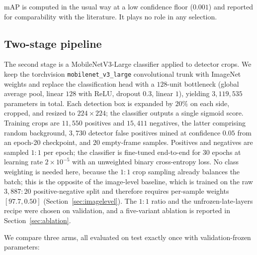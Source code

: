 mAP is computed in the usual way at a low confidence floor ($0.001$) and reported
for comparability with the literature. It plays no role in any selection.

\subsection{Two-stage pipeline}

The second stage is a MobileNetV3-Large classifier \citep{howard2019mobilenetv3}
applied to detector crops. We keep the torchvision
\texttt{mobilenet\_v3\_large} convolutional trunk with ImageNet weights and
replace the classification head with a $128$-unit bottleneck (global average
pool, linear $128$ with ReLU, dropout $0.3$, linear $1$), yielding
$3{,}119{,}535$ parameters in total. Each detection box is expanded by $20\%$ on
each side, cropped, and resized to $224\times224$; the classifier outputs a single
sigmoid score. Training crops are $11{,}550$ positives and $15{,}411$ negatives, the
latter comprising random background, $3{,}730$ detector false positives mined at
confidence $0.05$ from an epoch-20 checkpoint, and $20$ empty-frame samples.
Positives and negatives are sampled $1{:}1$ per epoch; the classifier is
fine-tuned end-to-end for $30$ epochs at learning rate $2\times10^{-5}$ with an
unweighted binary cross-entropy loss. No class weighting is needed here, because
the $1{:}1$ crop sampling already balances the batch; this is the opposite of the
image-level baseline, which is trained on the raw $3{,}887{:}20$ positive-negative
split and therefore requires per-sample weights $[97.7, 0.50]$
(Section~\ref{sec:imagelevel}). The $1{:}1$ ratio and the unfrozen-late-layers
recipe were chosen on validation, and a five-variant ablation is reported in
Section~\ref{sec:ablation}.

We compare three arms, all evaluated on test exactly once with validation-frozen
parameters:

